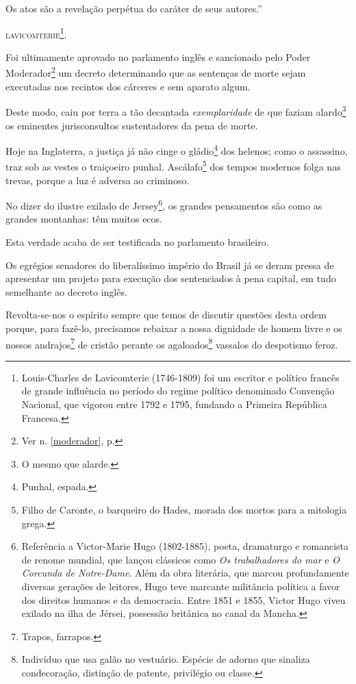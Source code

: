 Os atos são a revelação perpétua do caráter de seus autores.''

\textsc{lavicomterie}\footnote{Louis-Charles de Lavicomterie (1746-1809) foi um
  escritor e político francês de grande influência no período do regime
  político denominado Convenção Nacional, que vigorou entre 1792 e 1795,
  fundando a Primeira República Francesa.\label{lavi}}.

Foi ultimamente aprovado no parlamento inglês e sancionado pelo Poder
Moderador\footnote{Ver n. \ref{moderador}, p. \pageref{moderador}} 
um decreto determinando que as sentenças de morte sejam executadas nos 
recintos dos cárceres e sem aparato algum.

Deste modo, caiu por terra a tão decantada \emph{exemplaridade} de que
faziam alardo\footnote{O mesmo que alarde.} os eminentes
jurisconsultos sustentadores da pena de morte.

Hoje na Inglaterra, a justiça já não cinge o gládio\footnote{Punhal,
  espada.} dos helenos; como o assassino, traz sob as vestes o
traiçoeiro punhal. Ascálafo\footnote{Filho de Caronte, o barqueiro do
  Hades, morada dos mortos para a mitologia grega.} dos tempos modernos
folga nas trevas, porque a luz é adversa ao criminoso.

No dizer do ilustre exilado de Jersey\footnote{Referência a
  Victor-Marie Hugo (1802-1885), poeta, dramaturgo e romancista de
  renome mundial, que lançou clássicos como \emph{Os trabalhadores do
  mar} e \emph{O Corcunda de Notre-Dame}. Além da obra literária, que
  marcou profundamente diversas gerações de leitores, Hugo teve marcante
  militância política a favor dos direitos humanos e da democracia.
  Entre 1851 e 1855, Victor Hugo viveu exilado na ilha de Jérsei,
  possessão britânica no canal da Mancha.}, os grandes pensamentos são
como as grandes montanhas: têm muitos ecos.

Esta verdade acaba de ser testificada no parlamento brasileiro.

Os egrégios senadores do liberalíssimo império do Brasil já se deram
pressa de apresentar um projeto para execução dos sentenciados à pena
capital, em tudo semelhante ao decreto inglês.

Revolta-se-nos o espírito sempre que temos de discutir questões desta
ordem porque, para fazê-lo, precisamos rebaixar a nossa dignidade de
homem livre e os nossos andrajos\footnote{Trapos, farrapos.} de
cristão perante os agaloados\footnote{Indivíduo que usa galão no
  vestuário. Espécie de adorno que sinaliza condecoração, distinção de
  patente, privilégio ou classe.} vassalos do despotismo feroz.

